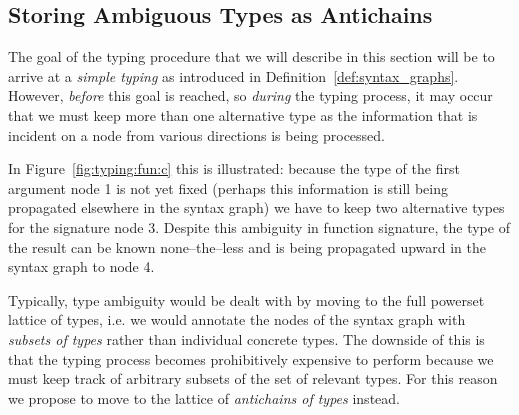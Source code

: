 \documentclass{sigplanconf}
\newcommand{\concept}[1]{\emph{#1}}
\begin{document}
\subsection{Storing Ambiguous Types as Antichains}\label{sec:antichains}

The goal of the typing procedure that we will describe in this section
will be to arrive at a \concept{simple typing} as introduced in
Definition~\ref{def:syntax_graphs}. However, \emph{before} this goal
is reached, so \emph{during} the typing process, it may occur that we
must keep more than one alternative type as the information that is
incident on a node from various directions is being processed.

In Figure~\ref{fig:typing:fun:c} this is illustrated: because the type of
the first argument node 1 is not yet fixed (perhaps this information
is still being propagated elsewhere in the syntax graph) we have to
keep two alternative types for the signature node 3. Despite this
ambiguity in function signature, the type of the result can be known
none--the--less and is being propagated upward in the syntax graph to
node 4.

Typically, type ambiguity would be dealt with by moving to the full
powerset lattice of types, i.e. we would annotate the nodes of the
syntax graph with \emph{subsets of types} rather than individual
concrete types. The downside of this is that the typing process
becomes prohibitively expensive to perform because we must keep track
of arbitrary subsets of the set of relevant types. For this reason we
propose to move to the lattice of \concept{antichains of types}
instead.
\end{document}
